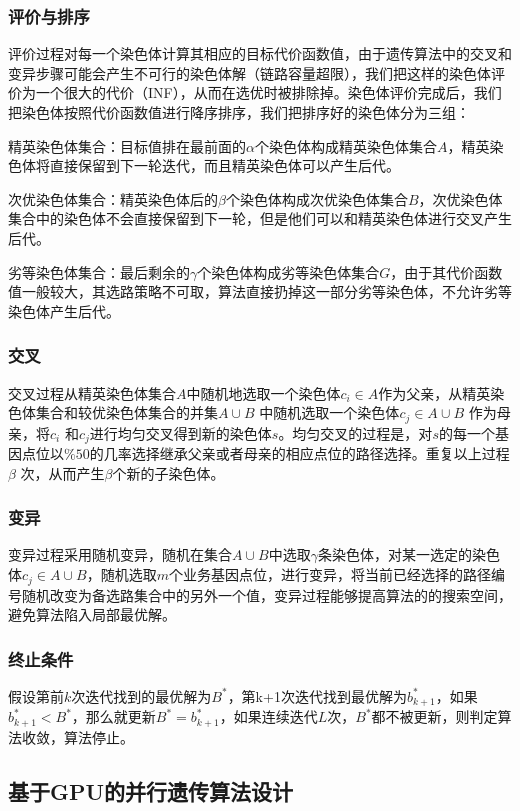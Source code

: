 \subsubsection{评价与排序}

评价过程对每一个染色体计算其相应的目标代价函数值，由于遗传算法中的交叉和变异步骤可能会产生不可行的染色体解（链路容量超限），我们把这样的染色体评价为一个很大的代价（INF），从而在选优时被排除掉。染色体评价完成后，我们把染色体按照代价函数值进行降序排序，我们把排序好的染色体分为三组：

精英染色体集合：目标值排在最前面的$\alpha$个染色体构成精英染色体集合$A$，精英染色体将直接保留到下一轮迭代，而且精英染色体可以产生后代。

次优染色体集合：精英染色体后的$\beta$个染色体构成次优染色体集合$B$，次优染色体集合中的染色体不会直接保留到下一轮，但是他们可以和精英染色体进行交叉产生后代。

劣等染色体集合：最后剩余的$\gamma$个染色体构成劣等染色体集合$G$，由于其代价函数值一般较大，其选路策略不可取，算法直接扔掉这一部分劣等染色体，不允许劣等染色体产生后代。
\subsubsection{交叉}
交叉过程从精英染色体集合$A$中随机地选取一个染色体$c_i \in A$作为父亲，从精英染色体集合和较优染色体集合的并集$A \cup B$ 中随机选取一个染色体$c_j \in A \cup B$ 作为母亲，将$c_i$ 和$c_j$进行均匀交叉得到新的染色体$s$。均匀交叉的过程是，对$s$的每一个基因点位以$\%50$的几率选择继承父亲或者母亲的相应点位的路径选择。重复以上过程$\beta$ 次，从而产生$\beta$个新的子染色体。
\subsubsection{变异}
变异过程采用随机变异，随机在集合$A \cup B$中选取$\gamma$条染色体，对某一选定的染色体$c_j \in A \cup B$，随机选取$m$个业务基因点位，进行变异，将当前已经选择的路径编号随机改变为备选路集合中的另外一个值，变异过程能够提高算法的的搜索空间，避免算法陷入局部最优解。
\subsubsection{终止条件}
假设第前$k$次迭代找到的最优解为$B^*$，第k+1次迭代找到最优解为$b_{k+1}^*$，如果$b_{k+1}^*<B^*$，那么就更新$B^*=b_{k+1}^*$，如果连续迭代$L$次，$B^*$都不被更新，则判定算法收敛，算法停止。
\subsection{基于GPU的并行遗传算法设计}
